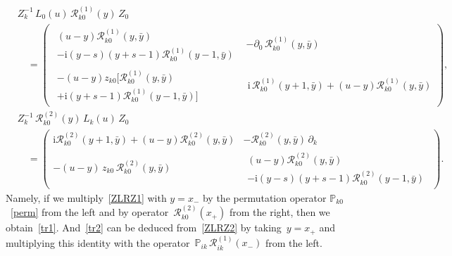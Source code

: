 \documentclass[a4paper,11pt]{article}
\renewcommand{\imath}{\mathrm{i}}
\numberwithin{equation}{section}
\begin{document}
\begin{align}
& \nonumber
Z_k^{-1}\,L_0(u)\,\mathcal{R}^{(1)}_{k0}(y)\,Z_0 \\
& \label{ZLRZ1}
\quad =
\left(
\begin{array}{c|c}
\begin{array}{l}
	(u-y)\mathcal{R}^{(1)}_{k0}(y,\bar{y}) \\
	-\imath(y-s)(y+s-1)\mathcal{R}^{(1)}_{k0}(y-1,\bar{y})
\end{array}
& -\partial_0\,\mathcal{R}^{(1)}_{k0}(y,\bar{y}) \\[10pt]
\hline
\begin{array}{l}
	-(u-y)z_{k0}\bigl[\mathcal{R}^{(1)}_{k0}(y,\bar{y}) \\
	+\imath(y+s-1)\mathcal{R}^{(1)}_{k0}(y-1,\bar{y})\bigr]
\end{array} &
\,\imath\,\mathcal{R}^{(1)}_{k0}(y+1,\bar{y}) +
(u-y)\mathcal{R}^{(1)}_{k0}(y,\bar{y})
\end{array}
\right),
\end{align}
\begin{align}
	& \nonumber
	Z_k^{-1}\,\mathcal{R}^{(2)}_{k0}(y)\,L_k(u)\,Z_0 \\
	& \label{ZLRZ2}
	\quad =
	\left(
	\begin{array}{c|c}
		\imath\mathcal{R}^{(2)}_{k0}(y+1,\bar{y})
		+ (u-y)\mathcal{R}^{(2)}_{k0}(y,\bar{y})
		& -\mathcal{R}^{(2)}_{k0}(y,\bar{y}) \, \partial_k \\[1pt]
		\hline
		-(u-y)\,z_{k0}\,\mathcal{R}^{(2)}_{k0}(y,\bar{y}) &
		\begin{array}{l}
			(u-y)\mathcal{R}^{(2)}_{k0}(y,\bar{y}) \\
			-\imath(y-s)(y+s-1)\mathcal{R}^{(2)}_{k0}(y-1,\bar{y})
		\end{array}
	\end{array}
	\right).
\end{align}
Namely, if we multiply~\eqref{ZLRZ1} with $y=x_-$ by the permutation operator $\mathbb{P}_{k0}$~\eqref{perm} from the left and by operator~$\mathcal{R}^{(2)}_{k0}(x_+)$ from the right, then we obtain~\eqref{tr1}.
And~\eqref{tr2} can be deduced from~\eqref{ZLRZ2} by taking~$y=x_+$ and multiplying this identity with the operator~$\mathbb{P}_{ik}\,\mathcal{R}^{(1)}_{ik}(x_-)$ from the left.
\end{document}

